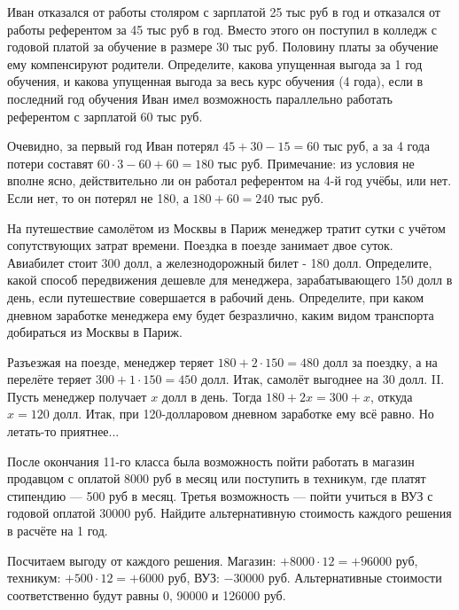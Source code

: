 \documentclass[a4paper]{article}
\begin{document}
\begin{problem}
Иван отказался от работы столяром с зарплатой 25 тыс руб в год и отказался от работы
референтом за 45 тыс руб в год. Вместо этого он поступил в колледж с годовой платой за
обучение в размере 30 тыс руб. Половину платы за обучение ему компенсируют родители.
Определите, какова упущенная выгода за 1 год обучения, и какова упущенная выгода за весь
курс обучения (4 года), если в последний год обучения Иван имел возможность параллельно
работать референтом с зарплатой 60 тыс руб.
\end{problem}
\begin{solution}
Очевидно, за первый год Иван потерял $45+30-15=60$ тыс руб, а за 4 года
потери составят $60\cdot 3-60+60=180$ тыс руб. Примечание: из условия не вполне ясно,
действительно ли он работал референтом на 4-й год учёбы, или нет. Если нет, то он потерял
не 180, а $180+60=240$ тыс руб.
\end{solution}

\begin{problem}
На путешествие самолётом из Москвы в Париж менеджер тратит сутки с учётом
сопутствующих затрат времени. Поездка в поезде занимает двое суток. Авиабилет стоит 300 долл,
а железнодорожный билет - 180 долл. Определите, какой способ передвижения дешевле для
менеджера, зарабатывающего 150 долл в день, если путешествие совершается в рабочий день.
Определите, при каком дневном заработке менеджера ему будет безразлично, каким видом
транспорта добираться из Москвы в Париж.
\end{problem}
\begin{solution}
Разъезжая на поезде, менеджер теряет $180 + 2\cdot 150=480$ долл за поездку,
а на перелёте теряет $300+1\cdot 150=450$ долл. Итак, самолёт выгоднее на 30 долл. II.
Пусть менеджер получает $x$ долл в день. Тогда $180+2x=300+x$, откуда $x=120$ долл. Итак,
при 120-долларовом дневном заработке ему всё равно. Но летать-то приятнее...
\end{solution}

\begin{problem}
После окончания 11-го класса была возможность пойти работать в магазин продавцом
с оплатой 8000 руб в месяц или поступить в техникум, где платят стипендию --- 500 руб
в месяц. Третья возможность --- пойти учиться в ВУЗ с годовой оплатой 30000 руб. Найдите
альтернативную стоимость каждого решения в расчёте на 1 год.
\end{problem}
\begin{solution}
Посчитаем выгоду от каждого решения. Магазин: $+8000 \cdot 12 = +96000$ руб, техникум:
$+500 \cdot 12=+6000$ руб, ВУЗ: $-30000$ руб. Альтернативные стоимости соответственно будут
равны 0, 90000 и 126000 руб.
\end{solution}
\end{document}

